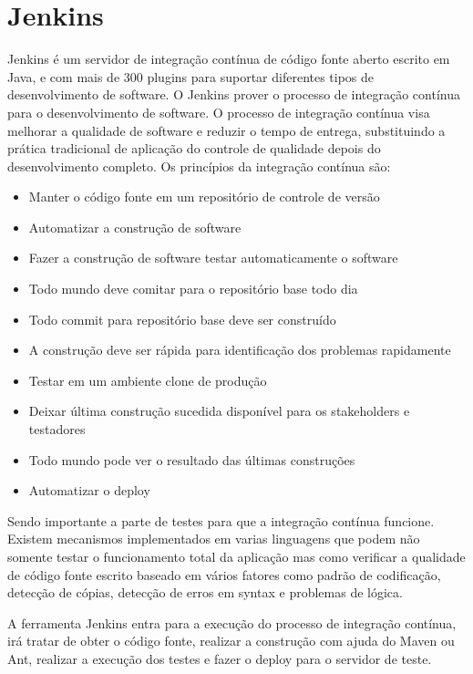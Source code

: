 \documentclass{abnt}
\begin{document}
	\section{Jenkins}
			
				Jenkins é um servidor de integração contínua de código fonte aberto escrito em Java, e com mais de 300 plugins para
				suportar diferentes tipos de desenvolvimento de software. O Jenkins prover o processo de integração contínua para o
				desenvolvimento de software.
				O processo de integração contínua visa melhorar a qualidade de software e reduzir o tempo de entrega, substituindo a
				prática tradicional de aplicação do controle de qualidade depois do desenvolvimento completo. Os princípios da
				integração contínua são:
				\begin{itemize}
				  \item Manter o código fonte em um repositório de controle de versão
				  \item Automatizar a construção de software
				  \item Fazer a construção de software testar automaticamente o software
				  \item Todo mundo deve comitar para o repositório base todo dia
				  \item Todo commit para repositório base deve ser construído
				  \item A construção deve ser rápida para identificação dos problemas rapidamente
				  \item Testar em um ambiente clone de produção
				  \item Deixar última construção sucedida disponível para os stakeholders e testadores
				  \item Todo mundo pode ver o resultado das últimas construções
				  \item Automatizar o deploy
				\end{itemize}
				
				Sendo importante a parte de testes para que a integração contínua funcione. Existem mecanismos implementados em
				varias linguagens que podem não somente testar o funcionamento total da aplicação mas como verificar a qualidade de
				código fonte escrito baseado em vários fatores como padrão de codificação, detecção de cópias, detecção de erros em
				syntax e problemas de lógica.
				
				A ferramenta Jenkins entra para a execução do processo de integração contínua, irá tratar de obter o código fonte,
				realizar a construção com ajuda do Maven ou Ant, realizar a execução dos testes e fazer o deploy para o servidor de
				teste.
\end{document}
